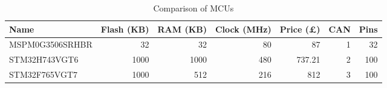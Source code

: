 \begin{table}[h]
  \centering
  \begin{tabular}{lrrrrrr}
    \toprule
    \textbf{Name} & \textbf{Flash (KB)} & \textbf{RAM (KB)} & \textbf{Clock (MHz)} & \textbf{Price (£)} & \textbf{CAN} & \textbf{Pins} \\
    \midrule
    MSPM0G3506SRHBR\tablefootnote{\url{https://www.ti.com/product/MSPM0G3506/part-details/MSPM0G3506SRHBR}} & 32 & 32 & 80 & 87 & 1 & 32 \\
    STM32H743VGT6\tablefootnote{\url{https://www.st.com/en/microcontrollers-microprocessors/stm32h743vg.html}} & 1000 & 1000 & 480 & 737.21 & 2 & 100 \\
    STM32F765VGT7\tablefootnote{\url{https://www.st.com/en/microcontrollers-microprocessors/stm32f765vg.html}} & 1000 & 512 & 216 & 812 & 3 & 100 \\
    \bottomrule
  \end{tabular}
  \caption{Comparison of MCUs}
  \label{tab:mcu-comparison}
\end{table}